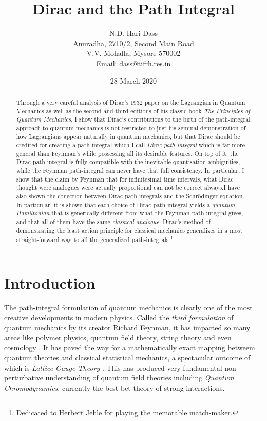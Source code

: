 \documentclass[12pt]{article}
\begin{document}
\title{Dirac and the Path Integral}
\author{N.D. Hari Dass \\  
Anuradha, 2710/2, Second Main Road\\V.V. Mohalla, Mysore 570002\\
Email: {dass@tifrh.res.in}}

\date{28 March 2020}

\maketitle

\begin{abstract}
Through a very careful analysis of Dirac's 1932 paper on the Lagrangian in Quantum Mechanics as well as the second and third editions
of his classic book {\it The Principles of Quantum Mechanics}, I show that Dirac's contributions to the birth of the path-integral approach
to quantum mechanics is not restricted to just his seminal demonstration of how Lagrangians appear naturally in quantum mechanics, but that
Dirac should be credited for creating a path-integral  which I call {\it Dirac path-integral} which is far more general than Feynman's while
possessing all its desirable features. On top of it, the Dirac path-integral is fully compatible with the inevitable quantisation ambiguities, 
while the Feynman path-integral can never have that full consistency. In particular, I show that the claim by Feynman that for infinitesimal
time intervals, what Dirac thought were analogues were actually proportional can not be correct always.I have also shown the conection
between Dirac path-integrals and the Schr\"odinger equation. In particular, it is shown that each choice of Dirac path-integral yields a
{\it quantum Hamiltonian} that is generically different from what the Feynman path-integral gives, and that all of them have the same
{\it classical analogue}. Dirac's method of demonstrating the least action principle for classical
mechanics generalizes in a most straight-forward way to all the generalized path-integrals.\footnote {Dedicated to Herbert Jehle for playing 
the memorable match-maker.}
\end{abstract}


\newpage

\section{Introduction}
The path-integral formulation of quantum mechanics is clearly one of the most creative developments in modern physics. Called the 
{\it third formulation} of quantum mechanics by its creator Richard Feynman, it has impacted so many areas like polymer physics, quantum field theory, string theory and even cosmology \cite{kleinert}. It has paved the way for a mathematically exact mapping betweem quantum theories and
classical statistical mechanics, a spectacular outcome of which is {\it Lattice Gauge Theory} \cite{seiler}. This has produced very fundamental non-perturbative understanding of quantum field theories including {\it Quantum Chromodynamics}, currently the best bet theory of strong interactions.
\end{document}
